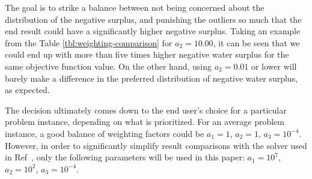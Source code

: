 The goal is to strike a balance between not being concerned about the distribution of the negative surplus, and punishing the outliers so much that the end result could have a significantly higher negative surplus.
Taking an example from the Table \ref{tbl:weighting-comparison} for $a_2 = 10.00$, it can be seen that we could end up with more than five times higher negative water surplus for the same objective function value.
On the other hand, using $a_2 = 0.01$ or lower will barely make a difference in the preferred distribution of negative water surplus, as expected.

The decision ultimately comes down to the end user's choice for a particular problem instance, depending on what is prioritized.
For an average problem instance, a good balance of weighting factors could be $a_1 = 1$, $a_2 = 1$, $a_3 = 10^{-4}$.
However, in order to significantly simplify result comparisons with the solver used in Ref~\cite{SkorinKapov/ILP}, only the following parameters will be used in this paper: $a_1 = 10^7$, $a_2 = 10^2$, $a_3 = 10^{-4}$.
